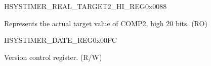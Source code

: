 \begin{register}{H}{SYSTIMER\_REAL\_TARGET2\_HI\_REG}{0x0088}\label{regdesc:SYSTIMERREALTARGET2HIREG}
%
%
\regnewline%
\begin{regdesc}\begin{reglist}
\label{fielddesc:SYSTIMERTARGET2HIRO}\item [SYSTIMER\_TARGET2\_HI\_RO] Represents the actual target value of COMP2, high 20 bits. (RO)
\end{reglist}\end{regdesc}
\end{register}


\begin{register}{H}{SYSTIMER\_DATE\_REG}{0x00FC}\label{regdesc:SYSTIMERDATEREG}
%
\regnewline%
\begin{regdesc}\begin{reglist}
\label{fielddesc:SYSTIMERDATE}\item [SYSTIMER\_DATE] Version control register. (R/W)
\end{reglist}\end{regdesc}
\end{register}
